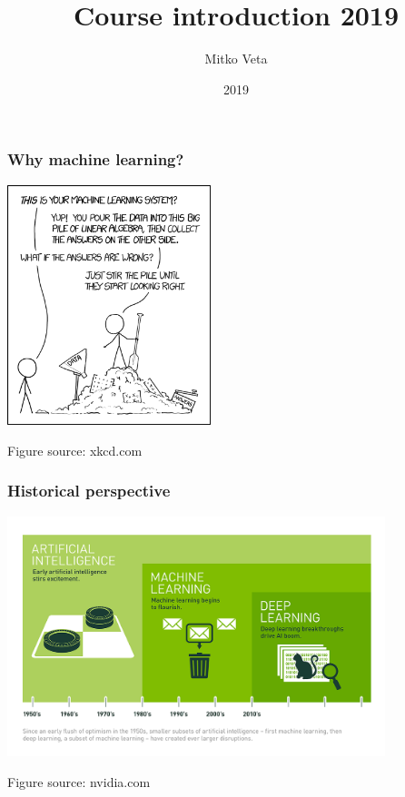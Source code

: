 \documentclass[notes]{beamer}          %
\title{Course introduction 2019}
\author{Mitko Veta}
\institute{Eindhoven University of Technology

Department of Biomedical Engineering}
\date{2019}
\begin{document}
 
\frame{\titlepage}

\begin{frame}
\frametitle{Why machine learning?}
\begin{center}
\includegraphics[height=7cm]{figures/intro/machine_learning.png}
\end{center}
{\tiny Figure source: xkcd.com}
\end{frame}

\begin{frame}
\frametitle{Historical perspective}
\begin{center}
\includegraphics[height=7cm]{figures/intro/deep_learning.png}
\end{center}
{\tiny Figure source: nvidia.com}
\end{frame}
\end{document}
